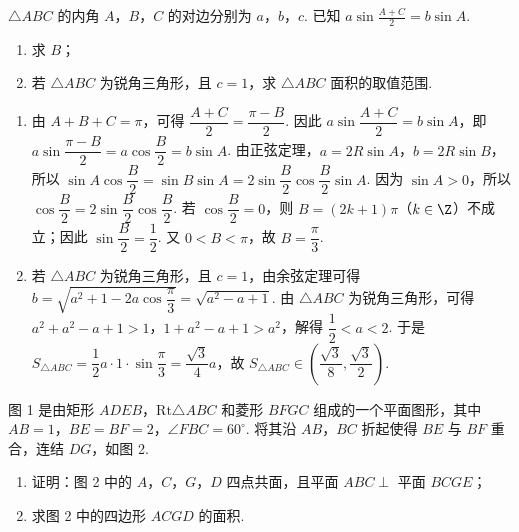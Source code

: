 \begin{problem}
\(\triangle ABC\) 的内角 \(A\)，\(B\)，\(C\) 的对边分别为 \(a\)，\(b\)，\(c\). 已知 \(a\sin\frac{A+C}{2}=b\sin A\).

\begin{enumerate}
\item 求 \(B\)；
\item 若 \(\triangle ABC\) 为锐角三角形，且 \(c=1\)，求 \(\triangle ABC\) 面积的取值范围.
\end{enumerate}
\end{problem}

\begin{solution}
\begin{enumerate}
\item 由 \(A+B+C=\pi\)，可得 \(\dfrac{A+C}{2}=\dfrac{\pi-B}{2}\). 因此 \(a\sin\dfrac{A+C}{2}=b\sin A\)，即 \(a\sin\dfrac{\pi-B}{2}=a\cos\dfrac B2=b\sin A\). 由正弦定理，\(a=2R\sin A\)，\(b=2R\sin B\)，所以 \(\sin A\cos\dfrac B2=\sin B\sin A=2\sin\dfrac B2\cos\dfrac B2\sin A\). 因为 \(\sin A>0\)，所以 \(\cos\dfrac B2=2\sin\dfrac B2\cos\dfrac B2\). 若 \(\cos\dfrac B2=0\)，则 \(B=(2k+1)\pi\)（\(k\in\Z\)）不成立；因此 \(\sin\dfrac B2=\dfrac12\). 又 \(0<B<\pi\)，故 \(B=\dfrac{\pi}{3}\).

\item 若 \(\triangle ABC\) 为锐角三角形，且 \(c=1\)，由余弦定理可得 \(b=\sqrt{a^2+1-2a\cos\dfrac{\pi}{3}}=\sqrt{a^2-a+1}\). 由 \(\triangle ABC\) 为锐角三角形，可得 \(a^2+a^2-a+1>1\)，\(1+a^2-a+1>a^2\)，解得 \(\dfrac12<a<2\). 于是 \(S_{\triangle ABC}=\dfrac12 a\cdot1\cdot\sin\dfrac{\pi}{3}=\dfrac{\sqrt3}{4}a\)，故 \(S_{\triangle ABC}\in\left(\dfrac{\sqrt3}{8},\dfrac{\sqrt3}{2}\right)\).
\end{enumerate}
\end{solution}

\begin{problem}
图 1 是由矩形 \(ADEB\)，\(\mathrm{Rt}\triangle ABC\) 和菱形 \(BFGC\) 组成的一个平面图形，其中 \(AB=1\)，\(BE=BF=2\)，\(\angle FBC=60^\circ\). 将其沿 \(AB\)，\(BC\) 折起使得 \(BE\) 与 \(BF\) 重合，连结 \(DG\)，如图 2.

\begin{enumerate}
\item 证明：图 2 中的 \(A\)，\(C\)，\(G\)，\(D\) 四点共面，且平面 \(ABC\perp\) 平面 \(BCGE\)；
\item 求图 2 中的四边形 \(ACGD\) 的面积.
\end{enumerate}

\end{problem}


